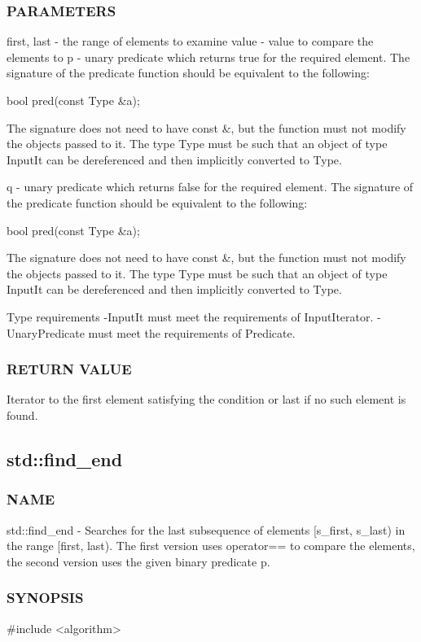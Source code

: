 \subsubsection{PARAMETERS}
first, last - the range of elements to examine
value - value to compare the elements to
p - unary predicate which returns true  for the required element.
The signature of the predicate function should be equivalent to the following:

 bool pred(const Type \&a);

The signature does not need to have const \&, but the function must not modify the objects passed to it.
The type Type must be such that an object of type InputIt can be dereferenced and then implicitly converted to Type.

q - unary predicate which returns false  for the required element.
The signature of the predicate function should be equivalent to the following:

 bool pred(const Type \&a);

The signature does not need to have const \&, but the function must not modify the objects passed to it.
The type Type must be such that an object of type InputIt can be dereferenced and then implicitly converted to Type.

 Type requirements
 -InputIt must meet the requirements of InputIterator.
 -UnaryPredicate must meet the requirements of Predicate.

\subsubsection{RETURN VALUE}
Iterator to the first element satisfying the condition or last if no such element is found.



\subsection{std::find\_end}

\subsubsection{NAME}
std::find\_end - Searches for the last subsequence of elements [s\_first, s\_last) in the range [first, last). The first version uses operator== to compare the elements, the second version uses the given binary predicate p.

\subsubsection{SYNOPSIS}
\#include <algorithm>

